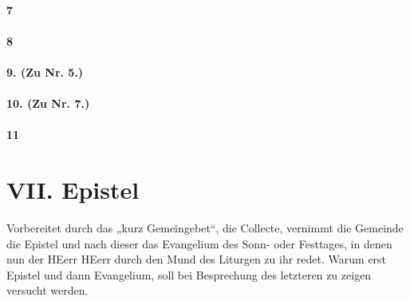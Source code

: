 
\subsubsection{7}


\subsubsection{8}


\subsubsection{9. (Zu Nr. 5.)}


\subsubsection{10. (Zu Nr. 7.)}


\subsubsection{11}


\chapter{VII. Epistel}


Vorbereitet durch das „kurz Gemeingebet“, die Collecte, vernimmt die Gemeinde die Epistel und nach dieser das Evangelium des Sonn- oder Festtages, in denen nun der HEerr HEerr durch den Mund des Liturgen zu ihr redet. Warum erst Epistel und dann Evangelium, soll bei Besprechung des letzteren zu zeigen versucht werden.

